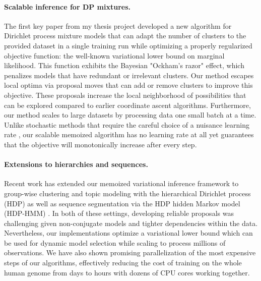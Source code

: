 \documentclass[11pt,letterpaper,sans]{article}
\begin{document}
\paragraph{Scalable inference for DP mixtures.}
The first key paper from my thesis project \cite{hughes:moVB} developed a new algorithm for Dirichlet process mixture models that can adapt the number of clusters to the provided dataset in a single training run while optimizing a properly regularized objective function: the well-known variational lower bound on marginal likelihood. This function exhibits the Bayesian "Ockham's razor" effect, which penalizes models that have redundant or irrelevant clusters. Our method escapes local optima via proposal moves that can add or remove clusters to improve this objective. These proposals increase the local neighborhood of possibilities that can be explored compared to earlier coordinate ascent algorithms. Furthermore, our method scales to large datasets by processing data one small batch at a time. Unlike stochastic methods that require the careful choice of a nuisance learning rate \cite{hoffman:svi}, our scalable memoized algorithm has no learning rate at all yet guarantees that the objective will monotonically increase after every step.

\paragraph{Extensions to hierarchies and sequences.}
Recent work has extended our memoized variational inference framework to group-wise clustering and topic modeling with the hierarchical Dirichlet process (HDP) \cite{hughes:hdpreliable} as well as sequence segmentation via the HDP hidden Markov model (HDP-HMM) \cite{hughes:hdphmm}. In both of these settings, developing reliable proposals was challenging given non-conjugate models and tighter dependencies within the data. Nevertheless, our implementations optimize a variational lower bound which can be used for dynamic model selection while scaling to process millions of observations. We have also shown promising parallelization of the most expensive steps of our algorithms, effectively reducing the cost of training on the whole human genome from days to hours with dozens of CPU cores working together.
\end{document}
